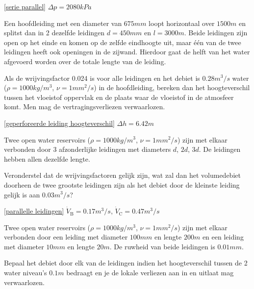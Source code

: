 \begin{antwoord}{\ref{serie parallel}}
	$\Delta p = 2080 \unit{kPa}$
\end{antwoord}
\begin{toepassing}
	\label{geperforeerde leiding hoogteverschil}
Een hoofdleiding met een diameter van $675 \unit{mm}$ loopt horizontaal over $1500 \unit{m}$ en splitst dan in 2 dezelfde leidingen $d=450 \unit{mm}$ en $l=3000 \unit{m}$. Beide leidingen zijn open op het einde en komen op de zelfde eindhoogte uit, maar één van de twee leidingen heeft ook openingen in de zijwand. Hierdoor gaat de helft van het water afgevoerd worden over de totale lengte van de leiding.

Als de wrijvingsfactor 0.024 is voor alle leidingen en het debiet is $0.28 \unit{m^3/s}$ water ($\rho=1000 \unit{kg/m^3}$, $\nu=1 \unit{mm^2/s}$) in de hoofdleiding, bereken dan het hoogteverschil tussen het vloeistof oppervlak en de plaats waar de vloeistof in de atmosfeer komt. Men mag de vertragingsverliezen verwaarlozen.
\end{toepassing}
\begin{antwoord}{\ref{geperforeerde leiding hoogteverschil}}
	$\Delta h = 6.42 \unit{m}$
\end{antwoord}
\begin{toepassing}
	\label{parallelle leidingen}
Twee open water reservoirs ($\rho=1000 \unit{kg/m^3}$, $\nu=1 \unit{mm^2/s}$) zijn met elkaar verbonden door 3 afzonderlijke leidingen met diameters $d$, $2d$, $3d$. De leidingen hebben allen dezelfde lengte.
		
Veronderstel dat de wrijvingsfactoren gelijk zijn, wat zal dan het volumedebiet doorheen de twee grootste leidingen zijn als het debiet door de kleinste leiding gelijk is aan $0.03 \unit{m^3/s}$? 
\end{toepassing}
\begin{antwoord}{\ref{parallelle leidingen}}
	$\dot{V}_\mathrm{B} = 0.17 \unit{m^3/s}$, $\dot{V}_\mathrm{C} = 0.47 \unit{m^3/s}$
\end{antwoord}
\begin{toepassing}[*]
	\label{turbulent laminair}
	Twee open water reservoirs ($\rho=1000 \unit{kg/m^3}$, $\nu=1 \unit{mm^2/s}$) zijn met elkaar verbonden door een leiding met diameter $100 \unit{mm}$ en lengte $200 \unit{m}$ en een leiding met diameter $10 \unit{mm}$ en lengte $20 \unit{m}$. De ruwheid van beide leidingen is $0.01 \unit{mm}$.
	
Bepaal het debiet door elk van de leidingen indien het hoogteverschil tussen de 2 water niveau's $0.1 \unit{m}$ bedraagt en je de lokale verliezen aan in en uitlaat mag verwaarlozen.
\end{toepassing}

